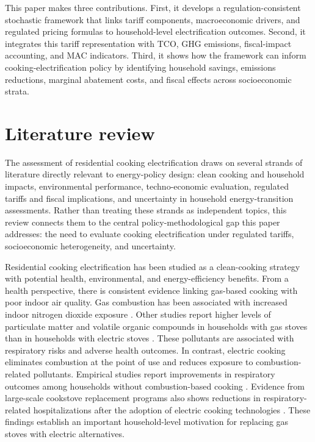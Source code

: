 \documentclass[authoryear,preprint,review,10pt]{elsarticle}
\begin{document}
This paper makes three contributions. First, it develops a regulation-consistent stochastic framework that links tariff components, macroeconomic drivers, and regulated pricing formulas to household-level electrification outcomes. Second, it integrates this tariff representation with TCO, GHG emissions, fiscal-impact accounting, and MAC indicators. Third, it shows how the framework can inform cooking-electrification policy by identifying household savings, emissions reductions, marginal abatement costs, and fiscal effects across socioeconomic strata.

\section{Literature review}
\label{literature}

The assessment of residential cooking electrification draws on several strands of literature directly relevant to energy-policy design: clean cooking and household impacts, environmental performance, techno-economic evaluation, regulated tariffs and fiscal implications, and uncertainty in household energy-transition assessments. Rather than treating these strands as independent topics, this review connects them to the central policy-methodological gap this paper addresses: the need to evaluate cooking electrification under regulated tariffs, socioeconomic heterogeneity, and uncertainty.

Residential cooking electrification has been studied as a clean-cooking strategy with potential health, environmental, and energy-efficiency benefits. From a health perspective, there is consistent evidence linking gas-based cooking with poor indoor air quality. Gas combustion has been associated with increased indoor nitrogen dioxide exposure \citep{dennekamp2001}. Other studies report higher levels of particulate matter and volatile organic compounds in households with gas stoves than in households with electric stoves \citep{kornartit2010,to2011}. These pollutants are associated with respiratory risks and adverse health outcomes. In contrast, electric cooking eliminates combustion at the point of use and reduces exposure to combustion-related pollutants. Empirical studies report improvements in respiratory outcomes among households without combustion-based cooking \citep{dai2021}. Evidence from large-scale cookstove replacement programs also shows reductions in respiratory-related hospitalizations after the adoption of electric cooking technologies \citep{gould2023}. These findings establish an important household-level motivation for replacing gas stoves with electric alternatives.
\end{document}
